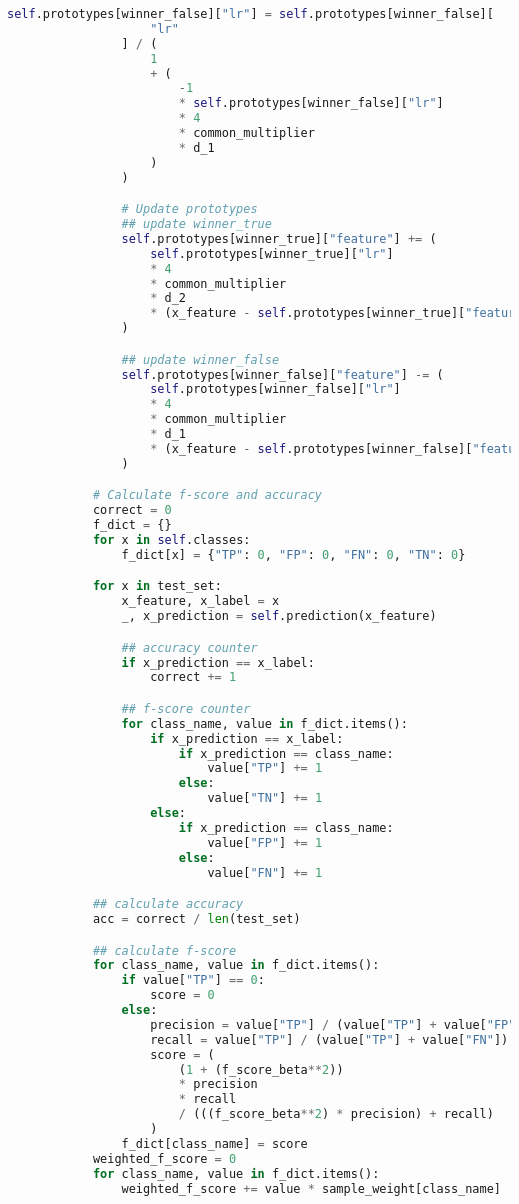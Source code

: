 \begin{lstlisting}[language = python]
                self.prototypes[winner_false]["lr"] = self.prototypes[winner_false][
                    "lr"
                ] / (
                    1
                    + (
                        -1
                        * self.prototypes[winner_false]["lr"]
                        * 4
                        * common_multiplier
                        * d_1
                    )
                )

                # Update prototypes
                ## update winner_true
                self.prototypes[winner_true]["feature"] += (
                    self.prototypes[winner_true]["lr"]
                    * 4
                    * common_multiplier
                    * d_2
                    * (x_feature - self.prototypes[winner_true]["feature"])
                )

                ## update winner_false
                self.prototypes[winner_false]["feature"] -= (
                    self.prototypes[winner_false]["lr"]
                    * 4
                    * common_multiplier
                    * d_1
                    * (x_feature - self.prototypes[winner_false]["feature"])
                )

            # Calculate f-score and accuracy
            correct = 0
            f_dict = {}
            for x in self.classes:
                f_dict[x] = {"TP": 0, "FP": 0, "FN": 0, "TN": 0}

            for x in test_set:
                x_feature, x_label = x
                _, x_prediction = self.prediction(x_feature)

                ## accuracy counter
                if x_prediction == x_label:
                    correct += 1

                ## f-score counter
                for class_name, value in f_dict.items():
                    if x_prediction == x_label:
                        if x_prediction == class_name:
                            value["TP"] += 1
                        else:
                            value["TN"] += 1
                    else:
                        if x_prediction == class_name:
                            value["FP"] += 1
                        else:
                            value["FN"] += 1

            ## calculate accuracy
            acc = correct / len(test_set)

            ## calculate f-score
            for class_name, value in f_dict.items():
                if value["TP"] == 0:
                    score = 0
                else:
                    precision = value["TP"] / (value["TP"] + value["FP"])
                    recall = value["TP"] / (value["TP"] + value["FN"])
                    score = (
                        (1 + (f_score_beta**2))
                        * precision
                        * recall
                        / (((f_score_beta**2) * precision) + recall)
                    )
                f_dict[class_name] = score
            weighted_f_score = 0
            for class_name, value in f_dict.items():
                weighted_f_score += value * sample_weight[class_name]


\end{lstlisting}
